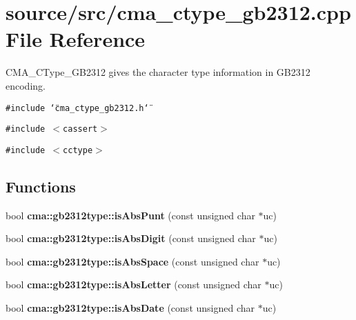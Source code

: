 \section{source/src/cma\_\-ctype\_\-gb2312.cpp File Reference}
\label{cma__ctype__gb2312_8cpp}
CMA\_\-CType\_\-GB2312 gives the character type information in GB2312 encoding.  


{\tt \#include \char`\"{}cma\_\-ctype\_\-gb2312.h\char`\"{}}\par
{\tt \#include $<$cassert$>$}\par
{\tt \#include $<$cctype$>$}\par
\subsection*{Functions}
\begin{CompactItemize}
\item 
bool {\bf cma::gb2312type::isAbsPunt} (const unsigned char $\ast$uc)
\item 
bool {\bf cma::gb2312type::isAbsDigit} (const unsigned char $\ast$uc)
\item 
bool {\bf cma::gb2312type::isAbsSpace} (const unsigned char $\ast$uc)
\item 
bool {\bf cma::gb2312type::isAbsLetter} (const unsigned char $\ast$uc)
\item 
bool {\bf cma::gb2312type::isAbsDate} (const unsigned char $\ast$uc)
\end{CompactItemize}
